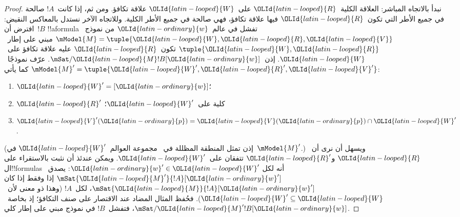 \documentclass[../../../include/open-logic-section]{subfiles}
\begin{document}
\begin{proof}
  نبدأ بالاتجاه المباشر: العلاقة الكلية~${\OLId{latin-looped}{R}}$ على~${\OLId{latin-looped}{W}}$ علاقة تكافؤ.
  ومن ثم، إذا كانت~$!A$ صالحة في جميع الأطر التي تكون~${\OLId{latin-looped}{R}}$ فيها علاقة
  تكافؤ، فهي صالحة في جميع الأطر الكلية. وللاتجاه الآخر نستدل
  بالمعاكس النقيض: افترض أن~$!B$ !!a{formula} تفشل في عالم~${\OLId{latin-ordinary}{w}}$ من
  نموذج~$\mModel{M} = \tuple{{\OLId{latin-looped}{W}}, {\OLId{latin-looped}{R}}, {\OLId{latin-looped}{V}}}$ مبني على إطار~$\tuple{{\OLId{latin-looped}{W}},{\OLId{latin-looped}{R}}}$
  تكون~${\OLId{latin-looped}{R}}$ عليه علاقة تكافؤ على~${\OLId{latin-looped}{W}}$. إذن~$\mSat/{{\OLId{latin-looped}{M}}}{!B}[{\OLId{latin-ordinary}{w}}]$. عرّف
  نموذجًا~$\mModel{M}' = \tuple{{\OLId{latin-looped}{W}}', {\OLId{latin-looped}{R}}', {\OLId{latin-looped}{V}}'}$ كما يأتي:
  \begin{enumerate}
  \item ${\OLId{latin-looped}{W}}' = [{\OLId{latin-ordinary}{w}}]$؛
  \item ${\OLId{latin-looped}{R}}'$ كلية على~${\OLId{latin-looped}{W}}'$؛
  \item ${\OLId{latin-looped}{V}}'({\OLId{latin-ordinary}{p}}) = {\OLId{latin-looped}{V}}({\OLId{latin-ordinary}{p}}) \cap {\OLId{latin-looped}{W}}'$.
  \end{enumerate}
  (إذن تمثل المنطقة المظللة في~ مجموعة
  العوالم~${\OLId{latin-looped}{W}}'$ في~$\mModel{M}'$.) ويسهل أن نرى أن~${\OLId{latin-looped}{R}}$ و${\OLId{latin-looped}{R}}'$ تتفقان
  على~${\OLId{latin-looped}{W}}'$. ويمكن عندئذ أن نثبت بالاستقراء على ال!!{formula}s أنه لكل
  ${\OLId{latin-ordinary}{w}}' \in {\OLId{latin-looped}{W}}'$: يصدق~$\mSat{{\OLId{latin-looped}{M}}'}{!A}[{\OLId{latin-ordinary}{w}}']$ إذا وفقط إذا كان
  $\mSat{{\OLId{latin-looped}{M}}}{!A}[{\OLId{latin-ordinary}{w}}']$، لكل~$!A$ (وهذا ذو معنى لأن~${\OLId{latin-looped}{W}}' \subseteq {\OLId{latin-looped}{W}}$).
  فحُفظ المثال المضاد عند الاقتصار على صنف التكافؤ؛ إذ بخاصة~$\mSat/{{\OLId{latin-looped}{M}}'}{!B}[{\OLId{latin-ordinary}{w}}]$، فتفشل~$!B$ في نموذج مبني على إطار كلي.
\end{proof}
\end{document}
